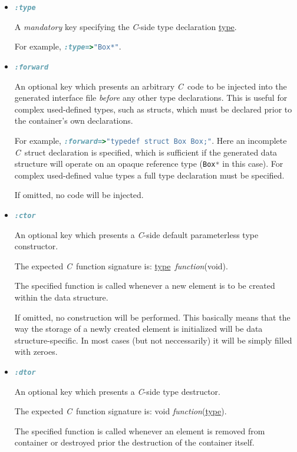 \documentclass[a4paper]{article}
\newcommand{\C}{\emph{C}}
\newcommand{\st}{\underline{type}}
\newcommand{\meth}[1]{#1}
\begin{document}
\begin{itemize}


\item \lstinline[language=Ruby]!:type!


A \emph{mandatory} key specifying the \C-side type declaration \st.


For example, \lstinline[language=Ruby]!:type=>"Box*"!.


\item \lstinline[language=Ruby]!:forward!


An optional key which presents an arbitrary \C\ code to be injected into the generated interface file \emph{before} any other type declarations.
This is useful for complex used-defined types, such as structs, which must be declared prior to the container's own declarations.


For example, \lstinline[language=Ruby]!:forward=>"typedef struct Box Box;"!.
Here an incomplete \C\ struct declaration is specified, which is sufficient if the generated data structure will operate on an opaque reference type (\lstinline[language=C]{Box*} in this case).
For complex used-defined value types a full type declaration must be specified.


If omitted, no code will be injected.


\item \lstinline[language=Ruby]!:ctor!


An optional key which presents a \C-side default parameterless type constructor.


The expected \C\ function signature is: \meth{\st\ \emph{function}(void)}.


The specified function is called whenever a new element is to be created within the data structure.


If omitted, no construction will be performed. This basically means that the way the storage of a newly created element is initialized will be data structure-specific. In most cases (but not neccessarily) it will be simply filled with zeroes.


\item \lstinline[language=Ruby]!:dtor!


An optional key which presents a \C-side type destructor.


The expected \C\ function signature is: \meth{void \emph{function}(\st)}.


The specified function is called whenever an element is removed from container or destroyed prior the destruction of the container itself.



\end{itemize}
\end{document}
